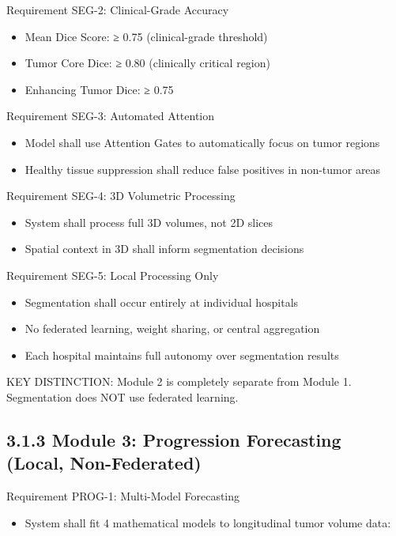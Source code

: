 Requirement SEG-2: Clinical-Grade Accuracy

\begin{itemize}
  \item Mean Dice Score: ≥ 0.75 (clinical-grade threshold)
  \item Tumor Core Dice: ≥ 0.80 (clinically critical region)
  \item Enhancing Tumor Dice: ≥ 0.75
\end{itemize}

Requirement SEG-3: Automated Attention

\begin{itemize}
  \item Model shall use Attention Gates to automatically focus on tumor regions
  \item Healthy tissue suppression shall reduce false positives in non-tumor areas
\end{itemize}

Requirement SEG-4: 3D Volumetric Processing

\begin{itemize}
  \item System shall process full 3D volumes, not 2D slices
  \item Spatial context in 3D shall inform segmentation decisions
\end{itemize}

Requirement SEG-5: Local Processing Only

\begin{itemize}
  \item Segmentation shall occur entirely at individual hospitals
  \item No federated learning, weight sharing, or central aggregation
  \item Each hospital maintains full autonomy over segmentation results
\end{itemize}

KEY DISTINCTION: Module 2 is completely separate from Module 1. Segmentation does NOT use federated learning.


\subsection{3.1.3 Module 3: Progression Forecasting (Local, Non-Federated)}
Requirement PROG-1: Multi-Model Forecasting

\begin{itemize}
  \item System shall fit 4 mathematical models to longitudinal tumor volume data:
\end{itemize}

